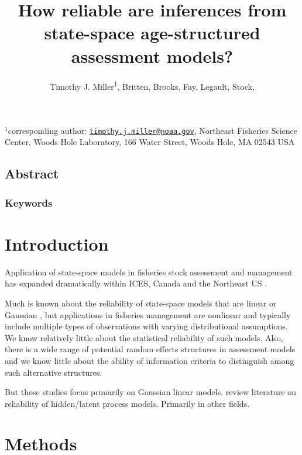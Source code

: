 \documentclass[
  12pt,
]{article}
\title{How reliable are inferences from state-space age-structured
assessment models?}
\author{Timothy J. Miller\textsuperscript{1}, Britten, Brooks, Fay,
Legault, Stock,}
\date{}
\begin{document}
\maketitle

\(^1\)corresponding author:
\href{mailto:timothy.j.miller@noaa.gov}{\nolinkurl{timothy.j.miller@noaa.gov}},
Northeast Fisheries Science Center, Woods Hole Laboratory, 166 Water
Street, Woods Hole, MA 02543 USA\\

\pagebreak

\hypertarget{abstract}{%
\subsection*{Abstract}\label{abstract}}

\hypertarget{keywords}{%
\subsubsection*{Keywords}\label{keywords}}

\pagebreak

\hypertarget{introduction}{%
\section{Introduction}\label{introduction}}

Application of state-space models in fisheries stock assessment and
management has expanded dramatically within ICES, Canada and the
Northeast US \citep{nielsenberg14,cadigan16,stockmiller21}.

Much is known about the reliability of state-space models that are
linear or Gaussian \citep{aeberhardetal18}, but applications in
fisheries management are nonlinear and typically include multiple types
of observations with varying distributional assumptions. We know
relatively little about the statistical reliability of such models.
Also, there is a wide range of potential random effects structures in
assessment models and we know little about the ability of information
criteria to distinguish among such alternative structures.

But those studies focus primarily on Gaussian linear models. review
literature on reliability of hidden/latent process models. Primarily in
other fields.

\hypertarget{methods}{%
\section{Methods}\label{methods}}
\end{document}
